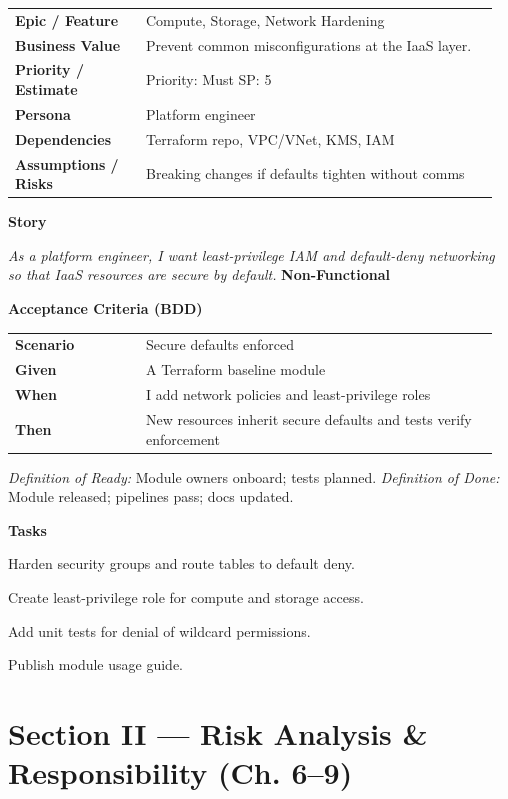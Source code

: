 \documentclass[11pt,letterpaper]{article}
\makeatletter
\newenvironment{kvtable}{%
  \begin{tabular}{@{}>{\bfseries\arraybackslash}p{0.26\linewidth} p{0.70\linewidth}@{}}
}{\end{tabular}}
\newenvironment{bdd}{%
  \begin{tabular}{@{}>{\bfseries\arraybackslash}p{0.26\linewidth} p{0.70\linewidth}@{}}
}{\end{tabular}}
\newcommand{\DoRDoD}[2]{%
  \vspace{0.35em}
  {\footnotesize\color{Muted}%
    \textit{Definition of Ready:} #1 \; \textbullet\;
    \textit{Definition of Done:} #2%
  }%
}
\newenvironment{storycard}[2]{%
  \begin{tcolorbox}[cloudcard, title={#1 --- #2}]%
}{\end{tcolorbox}}
\newcommand{\sectionlabel}[1]{\vspace{0.35em}\textbf{#1}\par}
\makeatother
\begin{document}
\begin{storycard}{CCS-5}{Ch. 5 — IaaS Focus}
\begin{kvtable}
Epic / Feature & Compute, Storage, Network Hardening\\
Business Value & Prevent common misconfigurations at the IaaS layer.\\
Priority / Estimate & Priority: Must \quad SP: 5\\
Persona & Platform engineer\\
Dependencies & Terraform repo, VPC/VNet, KMS, IAM\\
Assumptions / Risks & Breaking changes if defaults tighten without comms\\
\end{kvtable}
\sectionlabel{Story}
\textit{As a platform engineer, I want least-privilege IAM and default-deny networking so that IaaS resources are secure by default.}
\sectionlabel{Non-Functional}\;
\sectionlabel{Acceptance Criteria (BDD)}
\begin{bdd}
Scenario & Secure defaults enforced\\
Given & A Terraform baseline module\\
When & I add network policies and least-privilege roles\\
Then & New resources inherit secure defaults and tests verify enforcement\\
\end{bdd}
\DoRDoD{Module owners onboard; tests planned.}{Module released; pipelines pass; docs updated.}
\sectionlabel{Tasks}
\begin{checklist}
\item Harden security groups and route tables to default deny.
\item Create least-privilege role for compute and storage access.
\item Add unit tests for denial of wildcard permissions.
\item Publish module usage guide.
\end{checklist}
\end{storycard}

\section{Section II — Risk Analysis \& Responsibility (Ch. 6--9)}
\end{document}
